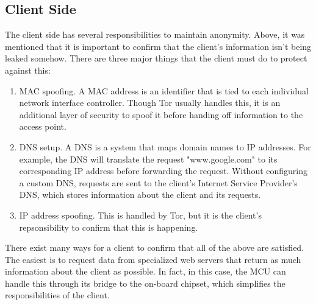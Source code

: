 \documentclass{article}
\begin{document}


\subsection*{Client Side}

The client side has several responsibilities to maintain anonymity. Above, it was mentioned that it is important to confirm that the client's information isn't being leaked somehow. There are three major things that the client must do to protect against this:

\begin{enumerate}
\item MAC spoofing. A MAC address is an identifier that is tied to each individual network interface controller. Though Tor usually handles this, it is an additional layer of security to spoof it before handing off information to the access point.
\item DNS setup. A DNS is a system that maps domain names to IP addresses. For example, the DNS will translate the request "www.google.com" to its corresponding IP address before forwarding the request. Without configuring a custom DNS, requests are sent to the client's Internet Service Provider's DNS, which stores information about the client and its requests.
\item IP address spoofing. This is handled by Tor, but it is the client's repsonsibility to confirm that this is happening.
\end{enumerate}

There exist many ways for a client to confirm that all of the above are satisfied. The easiest is to request data from specialized web servers that return as much information about the client as possible. In fact, in this case, the MCU can handle this through its bridge to the on-board chipset, which simplifies the responsibilities of the client.
\end{document}
